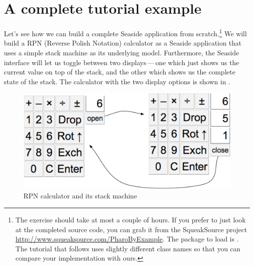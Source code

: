 \documentclass[a4paper,10pt,twoside]{book}
\begin{document}
{{

\section{A complete tutorial example}


Let's see how we can build a complete Seaside application from scratch.\footnote{The exercise should take at most a couple of hours. If you prefer to just look at the completed source code, you can grab it from the SqueakSource project \url{http://www.squeaksource.com/PharoByExample}.
The package to load is . The tutorial that follows uses slightly different class names so that you can compare your implementation with ours.}
We will build a RPN (Reverse Polish Notation) calculator as a Seaside application that uses a simple stack machine as its underlying model.
Furthermore, the Seaside interface will let us toggle between two displays\,---\,one which just shows us the current value on top of the stack, and the other which shows us the complete state of the stack.
The calculator with the two display options is shown in .

\begin{figure}[ht]
\begin{center}
\includegraphics[width=\textwidth]{stackMachine}
\caption{RPN calculator and its stack machine}
\end{center}
\end{figure}

}}
\end{document}
